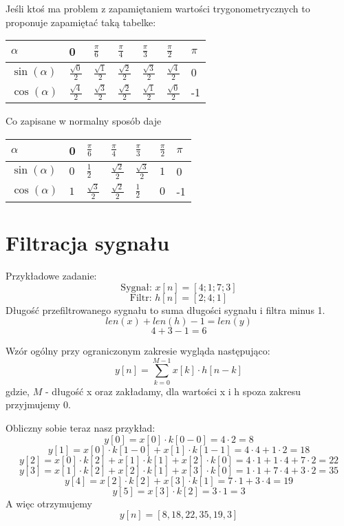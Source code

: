 \documentclass{article}
\begin{document}
Jeśli ktoś ma problem z zapamiętaniem wartości trygonometrycznych to proponuje zapamiętać taką tabelke:
\begin{center}
\renewcommand{\arraystretch}{1.5}
\begin{tabular}{|M{1cm}|M{1cm}|M{1cm}|M{1cm}|M{1cm}|M{1cm}|M{1cm}|}
    \hline
    $\alpha$ & 0 & $\frac{\pi}{6}$ & $\frac{\pi}{4}$ & $\frac{\pi}{3}$ & $\frac{\pi}{2}$ & $\pi$ \\
    \hline
    $\sin(\alpha)$ & $\frac{\sqrt{0}}{2}$ & $\frac{\sqrt{1}}{2}$ & $\frac{\sqrt{2}}{2}$ & $\frac{\sqrt{3}}{2}$ & $\frac{\sqrt{4}}{2}$ & 0 \\
    \hline
    $\cos(\alpha)$ & $\frac{\sqrt{4}}{2}$ & $\frac{\sqrt{3}}{2}$ & $\frac{\sqrt{2}}{2}$ & $\frac{\sqrt{1}}{2}$ & $\frac{\sqrt{0}}{2}$ & -1 \\
    \hline
\end{tabular}
\end{center}
Co zapisane w normalny sposób daje
\begin{center}
\renewcommand{\arraystretch}{1.5}
\begin{tabular}{|M{1cm}|M{1cm}|M{1cm}|M{1cm}|M{1cm}|M{1cm}|M{1cm}|}
    \hline
    $\alpha$ & 0 & $\frac{\pi}{6}$ & $\frac{\pi}{4}$ & $\frac{\pi}{3}$ & $\frac{\pi}{2}$ & $\pi$ \\
    \hline
    $\sin(\alpha)$ & $0$ & $\frac{1}{2}$ & $\frac{\sqrt{2}}{2}$ & $\frac{\sqrt{3}}{2}$ & $1$ & 0 \\
    \hline
    $\cos(\alpha)$ & $1$ & $\frac{\sqrt{3}}{2}$ & $\frac{\sqrt{2}}{2}$ & $\frac{{1}}{2}$ & $0$ & -1 \\
    \hline
\end{tabular}
\end{center}
\section{Filtracja sygnału}
Przykładowe zadanie:
\[
    \text{Sygnał: } x[n]=[4;1;7;3]
\]
\[
    \text{Filtr: } h[n]=[2;4;1]
\]
Długość przefiltrowanego sygnału to suma długości sygnału i filtra minus 1.
\[
    len(x) + len(h) - 1 = len(y)
\]
\[
    4 + 3 - 1 = 6
\]

Wzór ogólny przy ograniczonym zakresie wygląda następująco:
\[
    y[n] = \sum_{k=0}^{M - 1}x[k] \cdot h[n - k]
\]
gdzie, $M$ - długość x oraz zakładamy, dla wartości x i h spoza zakresu przyjmujemy 0.

Obliczny sobie teraz nasz przykład:
\[
    y[0] = x[0] \cdot k[0 - 0] = 4 \cdot 2 = 8
\]
\[
    y[1] = x[0] \cdot k[1 - 0] + x[1] \cdot k[1 - 1] = 4 \cdot 4 + 1 \cdot 2 = 18
\]
\[
    y[2] = x[0] \cdot k[2] + x[1] \cdot k[1] + x[2] \cdot k[0]  = 4 \cdot 1 + 1 \cdot 4 + 7 \cdot 2 = 22
\]
\[
    y[3] = x[1] \cdot k[2] + x[2] \cdot k[1] + x[3] \cdot k[0] = 1 \cdot 1 + 7 \cdot 4 + 3 \cdot 2 = 35
\]
\[
    y[4] = x[2] \cdot k[2] + x[3] \cdot k[1] = 7 \cdot 1 + 3 \cdot 4 = 19
\]
\[
    y[5] = x[3] \cdot k[2] = 3 \cdot 1  = 3
\]
A więc otrzymujemy
\[
    y[n] = [8,18,22,35,19,3]
\]
\end{document}
